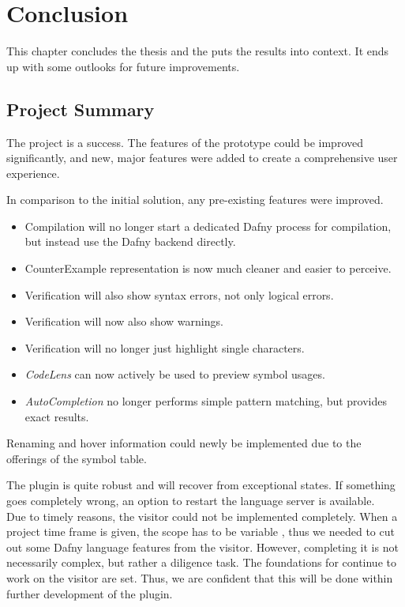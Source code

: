 \section{Conclusion}
\label{section:conclusion}
This chapter concludes the thesis and the puts the results into context.
It ends up with some outlooks for future improvements.

\subsection{Project Summary}
The project is a success.
The features of the prototype could be improved significantly, and new, major features were added to create a comprehensive user experience.

In comparison to the initial solution, any pre-existing features were improved.
\begin{itemize}
 \item Compilation will no longer start a dedicated Dafny process for compilation, but instead use the Dafny backend directly.
 \item CounterExample representation is now much cleaner and easier to perceive.
 \item Verification will also show syntax errors, not only logical errors.
 \item Verification will now also show warnings.
 \item Verification will no longer just highlight single characters.
 \item \textit{CodeLens} can now actively be used to preview symbol usages.
 \item \textit{AutoCompletion} no longer performs simple pattern matching, but provides exact results.
\end{itemize}
Renaming and hover information could newly be implemented due to the offerings of the symbol table.

The plugin is quite robust and will recover from exceptional states.
If something goes completely wrong, an option to restart the language server is available.\\

Due to timely reasons, the visitor could not be implemented completely.
When a project time frame is given, the scope has to be variable \cite{keller},
thus we needed to cut out some Dafny language features from the visitor.
However, completing it is not necessarily complex, but rather a diligence task.
The foundations for continue to work on the visitor are set.
Thus, we are confident that this will be done within further development of the plugin.\\

